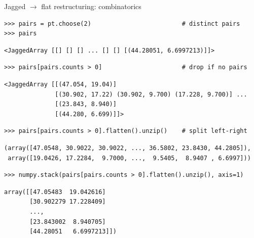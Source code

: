 \documentclass[aspectratio=169]{beamer}
\begin{document}
\begin{frame}[fragile]{Jagged $\to$ flat restructuring: combinatorics}
\small
\begin{verbatim}
>>> pairs = pt.choose(2)                         # distinct pairs
>>> pairs
\end{verbatim}

\vspace{-0.45 cm}
\color{darkblue}\begin{verbatim}
<JaggedArray [[] [] [] ... [] [] [(44.28051, 6.6997213)]]>
\end{verbatim}
\color{black}

\vspace{-0.5\baselineskip}
\begin{verbatim}
>>> pairs[pairs.counts > 0]                      # drop if no pairs
\end{verbatim}

\vspace{-0.45 cm}
\color{darkblue}\begin{verbatim}
<JaggedArray [[(47.054, 19.04)]
              [(30.902, 17.22) (30.902, 9.700) (17.228, 9.700)] ...
              [(23.843, 8.940)]
              [(44.280, 6.699)]]>
\end{verbatim}
\color{black}

\vspace{-0.5\baselineskip}
\begin{verbatim}
>>> pairs[pairs.counts > 0].flatten().unzip()    # split left-right
\end{verbatim}

\vspace{-0.45 cm}
\color{darkblue}\begin{verbatim}
(array([47.0548, 30.9022, 30.9022, ..., 36.5802, 23.8430, 44.2805]),
 array([19.0426, 17.2284,  9.7000, ...,  9.5405,  8.9407 , 6.6997]))
\end{verbatim}
\color{black}

\vspace{-0.5\baselineskip}
\begin{verbatim}
>>> numpy.stack(pairs[pairs.counts > 0].flatten().unzip(), axis=1)
\end{verbatim}

\vspace{-0.45 cm}
\color{darkblue}\begin{verbatim}
array([[47.05483  19.042616]
       [30.902279 17.228409]
       ...,
       [23.843002  8.940705]
       [44.28051   6.6997213]])
\end{verbatim}
\color{black}
\end{frame}
\end{document}
